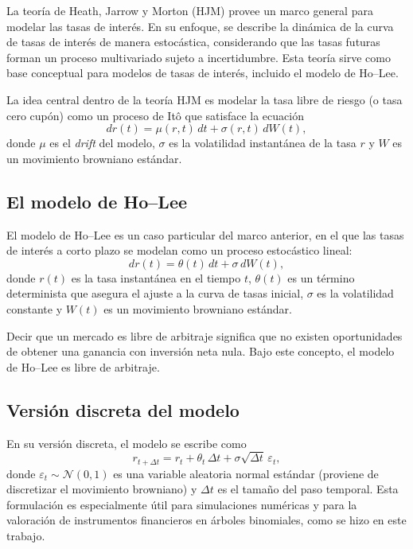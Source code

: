 \qquad La teoría de Heath, Jarrow y Morton (HJM) provee un marco general para modelar las tasas de interés. En su enfoque, se describe la dinámica de la curva de tasas de interés de manera estocástica, considerando que las tasas futuras forman un proceso multivariado sujeto a incertidumbre. Esta teoría sirve como base conceptual para modelos de tasas de interés, incluido el modelo de Ho–Lee.

\qquad La idea central dentro de la teoría HJM es modelar la tasa libre de riesgo (o tasa cero cupón) como un proceso de Itô que satisface la ecuación
\begin{equation}
    dr(t) = \mu(r,t)\,dt + \sigma(r,t)\,dW(t),
\end{equation}
donde $\mu$ es el \emph{drift} del modelo, $\sigma$ es la volatilidad instantánea de la tasa $r$ y $W$ es un movimiento browniano estándar.

\subsection{El modelo de Ho--Lee}

\qquad El modelo de Ho--Lee es un caso particular del marco anterior, en el que las tasas de interés a corto plazo se modelan como un proceso estocástico lineal:
\begin{equation}
    dr(t) = \theta(t)\,dt + \sigma\,dW(t),
\end{equation}
donde $r(t)$ es la tasa instantánea en el tiempo $t$, $\theta(t)$ es un término determinista que asegura el ajuste a la curva de tasas inicial, $\sigma$ es la volatilidad constante y $W(t)$ es un movimiento browniano estándar.

\qquad Decir que un mercado es libre de arbitraje significa que no existen oportunidades de obtener una ganancia con inversión neta nula. Bajo este concepto, el modelo de Ho--Lee es libre de arbitraje.

\subsection{Versión discreta del modelo}

\qquad En su versión discreta, el modelo se escribe como
\begin{equation}
    r_{t+\Delta t} = r_t + \theta_t\,\Delta t + \sigma \sqrt{\Delta t}\,\varepsilon_t,
\end{equation}
donde $\varepsilon_t \sim \mathcal{N}(0,1)$ es una variable aleatoria normal estándar (proviene de discretizar el movimiento browniano) y $\Delta t$ es el tamaño del paso temporal. Esta formulación es especialmente útil para simulaciones numéricas y para la valoración de instrumentos financieros en árboles binomiales, como se hizo en este trabajo.


